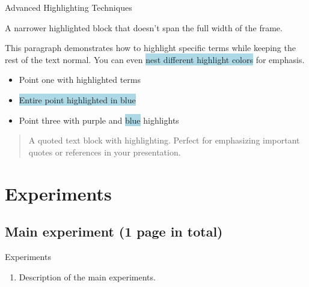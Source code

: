 \documentclass[handout,t,aspectratio=1610]{beamer}
\newcommand{\hlp}[1]{\colorbox{lightpurple}{#1}}
\newcommand{\hlb}[1]{\colorbox{lightblue}{#1}}
\begin{document}
\begin{frame}{Advanced Highlighting Techniques}
    \begin{tcolorbox}[
        colback=lightpurple,
        boxrule=0pt,
        width=0.99\textwidth,
        left=2pt,
        right=2pt
    ]
    A narrower highlighted block that doesn't span
    the full width of the frame.
    \end{tcolorbox}

    \vspace{1em}

    This paragraph demonstrates how to \hlp{highlight specific terms}
    while keeping the rest of the text normal. You can even
    \hlb{nest different \hlp{highlight} colors} for emphasis.

    \vspace{1em}

    \begin{itemize}
        \item Point one with \hlp{highlighted terms}
        \item \hlb{Entire point highlighted in blue}
        \item Point three with \hlp{purple} and \hlb{blue} highlights
    \end{itemize}

    \begin{bluebox}
    \begin{quote}
    A quoted text block with highlighting. Perfect for emphasizing
    important quotes or references in your presentation.
    \end{quote}
    \end{bluebox}
\end{frame}


\section{Experiments}
\subsection{Main experiment (1 page in total)}
\begin{frame}{Experiments}
    \begin{enumerate}
        \item Description of the main experiments.
    \end{enumerate}

\end{frame}
\end{document}
